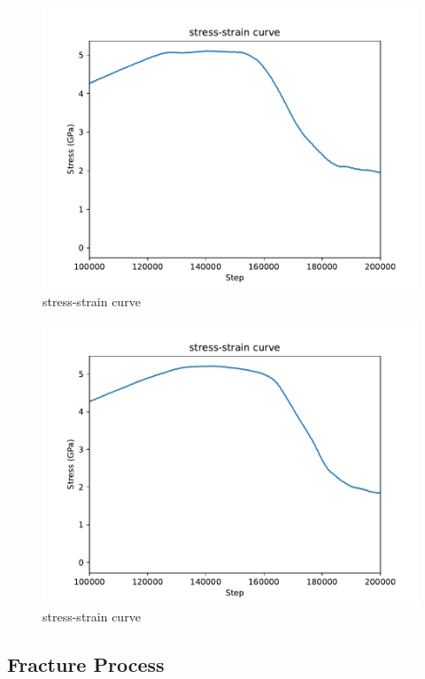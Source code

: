 \documentclass[final,5p,times,onecolumn]{elsarticle}
\begin{document}
\begin{figure}
	\centering
	\includegraphics[width=1\linewidth]{img/ialine}
	\caption{stress-strain curve}
	\label{fig:ia_line}
\end{figure}

\begin{figure}
	\centering
	\includegraphics[width=1\linewidth]{img/agline}
	\caption{stress-strain curve}
	\label{fig:ag_line}
\end{figure}

\subsection{Fracture Process}
\end{document}
